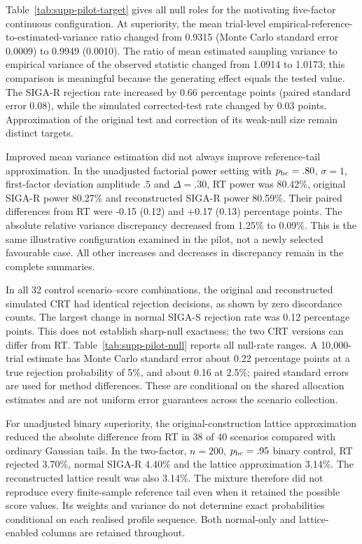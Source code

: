 \documentclass[12pt,a4paper]{article}
\theoremstyle{definition}
\theoremstyle{remark}\newtheorem{remark}{Remark}
\numberwithin{equation}{section}
\begin{document}
Table~\ref{tab:supp-pilot-target} gives all null roles for the motivating five-factor continuous configuration. At superiority, the mean trial-level empirical-reference-to-estimated-variance ratio changed from 0.9315 (Monte Carlo standard error 0.0009) to 0.9949 (0.0010). The ratio of mean estimated sampling variance to empirical variance of the observed statistic changed from 1.0914 to 1.0173; this comparison is meaningful because the generating effect equals the tested value. The SIGA-R rejection rate increased by 0.66 percentage points (paired standard error 0.08), while the simulated corrected-test rate changed by 0.03 points. Approximation of the original test and correction of its weak-null size remain distinct targets.

Improved mean variance estimation did not always improve reference-tail approximation. In the unadjusted factorial power setting with $p_{\rm bc}=.80$, $\sigma=1$, first-factor deviation amplitude $.5$ and $\Delta=.30$, RT power was 80.42\%, original SIGA-R power 80.27\% and reconstructed SIGA-R power 80.59\%. Their paired differences from RT were -0.15 (0.12) and +0.17 (0.13) percentage points. The absolute relative variance discrepancy decreased from 1.25\% to 0.09\%. This is the same illustrative configuration examined in the pilot, not a newly selected favourable case. All other increases and decreases in discrepancy remain in the complete summaries.

In all 32 control scenario--score combinations, the original and reconstructed simulated CRT had identical rejection decisions, as shown by zero discordance counts. The largest change in normal SIGA-S rejection rate was 0.12 percentage points. This does not establish sharp-null exactness: the two CRT versions can differ from RT. Table~\ref{tab:supp-pilot-null} reports all null-rate ranges. A 10,000-trial estimate has Monte Carlo standard error about 0.22 percentage points at a true rejection probability of 5\%, and about 0.16 at 2.5\%; paired standard errors are used for method differences. These are conditional on the shared allocation estimates and are not uniform error guarantees across the scenario collection.

For unadjusted binary superiority, the original-construction lattice approximation reduced the absolute difference from RT in 38 of 40 scenarios compared with ordinary Gaussian tails. In the two-factor, $n=200$, $p_{\rm bc}=.95$ binary control, RT rejected 3.70\%, normal SIGA-R 4.40\% and the lattice approximation 3.14\%. The reconstructed lattice result was also 3.14\%. The mixture therefore did not reproduce every finite-sample reference tail even when it retained the possible score values. Its weights and variance do not determine exact probabilities conditional on each realised profile sequence. Both normal-only and lattice-enabled columns are retained throughout.
\end{document}
